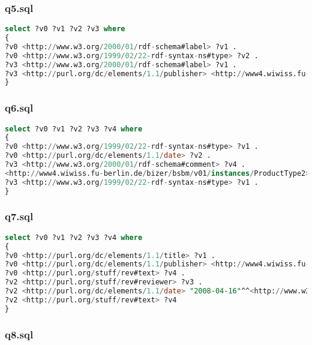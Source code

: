 \documentclass[titlepage, a4paper, 12pt] {article}
\begin{document}
\subsubsection{q5.sql}

\begin{lstlisting}[language=SQL] 
select ?v0 ?v1 ?v2 ?v3 where
{
?v0 <http://www.w3.org/2000/01/rdf-schema#label> ?v1 .
?v0 <http://www.w3.org/1999/02/22-rdf-syntax-ns#type> ?v2 .
?v3 <http://www.w3.org/2000/01/rdf-schema#label> ?v1 .
?v3 <http://purl.org/dc/elements/1.1/publisher> <http://www4.wiwiss.fu-berlin.de/bizer/bsbm/v01/instances/StandardizationInstitution1> .
}
\end{lstlisting}

\subsubsection{q6.sql}

\begin{lstlisting}[language=SQL] 
select ?v0 ?v1 ?v2 ?v3 ?v4 where
{
?v0 <http://www.w3.org/1999/02/22-rdf-syntax-ns#type> ?v1 .
?v0 <http://purl.org/dc/elements/1.1/date> ?v2 .
?v3 <http://www.w3.org/2000/01/rdf-schema#comment> ?v4 .
<http://www4.wiwiss.fu-berlin.de/bizer/bsbm/v01/instances/ProductType2> <http://www.w3.org/2000/01/rdf-schema#comment> ?v4 .
?v3 <http://www.w3.org/1999/02/22-rdf-syntax-ns#type> ?v1 .
}
\end{lstlisting}

\subsubsection{q7.sql}

\begin{lstlisting}[language=SQL] 
select ?v0 ?v1 ?v2 ?v3 ?v4 where
{
?v0 <http://purl.org/dc/elements/1.1/title> ?v1 .
?v0 <http://purl.org/dc/elements/1.1/publisher> <http://www4.wiwiss.fu-berlin.de/bizer/bsbm/v01/instances/dataFromRatingSite11/RatingSite11> .
?v0 <http://purl.org/stuff/rev#text> ?v4 .
?v2 <http://purl.org/stuff/rev#reviewer> ?v3 .
?v2 <http://purl.org/dc/elements/1.1/date> "2008-04-16"^^<http://www.w3.org/2001/XMLSchema#date> .
?v2 <http://purl.org/stuff/rev#text> ?v4
}
\end{lstlisting}

\subsubsection{q8.sql}
\end{document}
